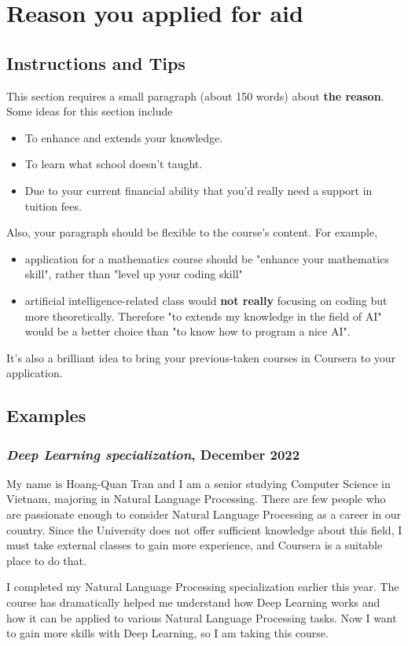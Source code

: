 \chapter{Reason you applied for aid}

\section{Instructions and Tips}
This section requires a small paragraph (about 150 words) about \textbf{the reason}. Some ideas for this section include
\begin{itemize}
\item To enhance and extends your knowledge.
\item To learn what school doesn't taught.
\item Due to your current financial ability that you'd really need a support in tuition fees.
\end{itemize}
Also, your paragraph should be flexible to the course's content. For example, 
\begin{itemize}
\item application for a mathematics course should be "enhance your mathematics skill", rather than "level up your coding skill"
\item artificial intelligence-related class would \textbf{not really} focusing on coding but more theoretically. Therefore "to extends my knowledge in the field of AI" would be a better choice than "to know how to program a nice AI".
\end{itemize}
It's also a brilliant idea to bring your previous-taken courses in Coursera to your application.

\section{Examples}
\subsection{\textit{Deep Learning specialization}, December 2022}
My name is Hoang-Quan Tran and I am a senior studying Computer Science in Vietnam, majoring in Natural Language Processing. There are few people who are passionate enough to consider Natural Language Processing as a career in our country. Since the University does not offer sufficient knowledge about this field, I must take external classes to gain more experience, and Coursera is a suitable place to do that. 

I completed my Natural Language Processing specialization earlier this year. The course has dramatically helped me understand how Deep Learning works and how it can be applied to various Natural Language Processing tasks. Now I want to gain more skills with Deep Learning, so I am taking this course. 

